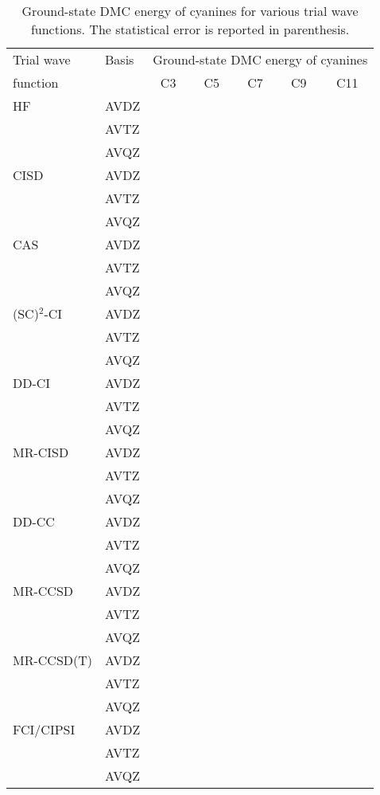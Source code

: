 \documentclass[aip,jcp,reprint,showkeys]{revtex4-1}
\newcommand{\mc}{\multicolumn}
\newcommand{\SCSC}{(SC)$^2$}
\begin{document}
\begin{table*}
	\caption{
	\label{tab:DMC-GS-energy}
	Ground-state DMC energy of cyanines for various trial wave functions.	
	The statistical error is reported in parenthesis.}
	\begin{ruledtabular}
	\begin{tabular}{llccccc}
		Trial wave 	&	Basis		&	\mc{5}{c}{Ground-state DMC energy of cyanines}				\\
										\cline{3-7}
		function	&				&	C3		&	C5		&	C7		&	C9		&	C11		\\
					\hline
		HF			&	AVDZ		&			&			&			&			&			\\
					&	AVTZ		&			&			&			&			&			\\
					&	AVQZ		&			&			&			&			&			\\
					\hline
		CISD		&	AVDZ		&			&			&			&			&			\\
					&	AVTZ		&			&			&			&			&			\\
					&	AVQZ		&			&			&			&			&			\\
					\hline
		CAS			&	AVDZ		&			&			&			&			&			\\
					&	AVTZ		&			&			&			&			&			\\
					&	AVQZ		&			&			&			&			&			\\
					\hline
		\SCSC-CI	&	AVDZ		&			&			&			&			&			\\
					&	AVTZ		&			&			&			&			&			\\
					&	AVQZ		&			&			&			&			&			\\
					\hline
		DD-CI		&	AVDZ		&			&			&			&			&			\\
					&	AVTZ		&			&			&			&			&			\\
					&	AVQZ		&			&			&			&			&			\\
					\hline
		MR-CISD		&	AVDZ		&			&			&			&			&			\\
					&	AVTZ		&			&			&			&			&			\\
					&	AVQZ		&			&			&			&			&			\\
					\hline
		DD-CC		&	AVDZ		&			&			&			&			&			\\
					&	AVTZ		&			&			&			&			&			\\
					&	AVQZ		&			&			&			&			&			\\
					\hline
		MR-CCSD		&	AVDZ		&			&			&			&			&			\\
					&	AVTZ		&			&			&			&			&			\\
					&	AVQZ		&			&			&			&			&			\\
					\hline
		MR-CCSD(T)	&	AVDZ		&			&			&			&			&			\\
					&	AVTZ		&			&			&			&			&			\\
					&	AVQZ		&			&			&			&			&			\\
					\hline
		FCI/CIPSI	&	AVDZ		&			&			&			&			&			\\
					&	AVTZ		&			&			&			&			&			\\
					&	AVQZ		&			&			&			&			&			\\
	\end{tabular}		
	\end{ruledtabular}		
\end{table*}		
\end{document}
